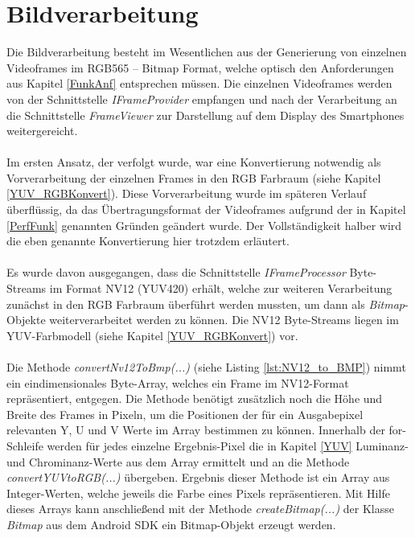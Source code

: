\chapter{Bildverarbeitung} \label{chap:Bildverarbeitung}

Die Bildverarbeitung besteht im Wesentlichen aus der Generierung von einzelnen Videoframes im RGB565 – Bitmap Format, welche optisch den Anforderungen aus Kapitel \ref{FunkAnf} entsprechen müssen. Die einzelnen Videoframes werden von der Schnittstelle \textit{IFrameProvider} empfangen und nach der Verarbeitung an die Schnittstelle \textit{FrameViewer} zur Darstellung auf dem Display des Smartphones weitergereicht.
\\
\\
Im ersten Ansatz, der verfolgt wurde, war eine Konvertierung notwendig als Vorverarbeitung der einzelnen Frames in den RGB Farbraum (siehe Kapitel \ref{YUV_RGBKonvert}). Diese Vorverarbeitung wurde im späteren Verlauf überflüssig, da das Übertragungsformat der Videoframes aufgrund der in Kapitel \ref{PerfFunk} genannten Gründen geändert wurde. Der Vollständigkeit halber wird die eben genannte Konvertierung hier trotzdem erläutert.
\\
\\
Es wurde davon ausgegangen, dass die Schnittstelle \textit{IFrameProcessor} Byte-Streams im Format NV12 (YUV420) erhält, welche zur weiteren Verarbeitung zunächst in den RGB Farbraum überführt werden mussten, um dann als \textit{Bitmap}-Objekte weiterverarbeitet werden zu können. Die NV12 Byte-Streams liegen im YUV-Farbmodell (siehe Kapitel \ref{YUV_RGBKonvert}) vor. 
\\
\\
Die Methode \textit{convertNv12ToBmp(...)} (siehe Listing \ref{lst:NV12_to_BMP}) nimmt ein eindimensionales Byte-Array, welches ein Frame im NV12-Format repräsentiert, entgegen. Die Methode benötigt zusätzlich noch die Höhe und Breite des Frames in Pixeln, um die Positionen der für ein Ausgabepixel relevanten Y, U und V Werte im Array bestimmen zu können. Innerhalb der for-Schleife werden für jedes einzelne Ergebnis-Pixel die in Kapitel \ref{YUV} Luminanz- und Chrominanz-Werte aus dem Array ermittelt und an die Methode \textit{convertYUVtoRGB(...)} übergeben. Ergebnis dieser Methode ist ein Array aus Integer-Werten, welche jeweils die Farbe eines Pixels repräsentieren. Mit Hilfe dieses Arrays kann anschließend mit der Methode \textit{createBitmap(...)} der Klasse \textit{Bitmap} aus dem Android SDK ein Bitmap-Objekt erzeugt werden. 
\clearpage

